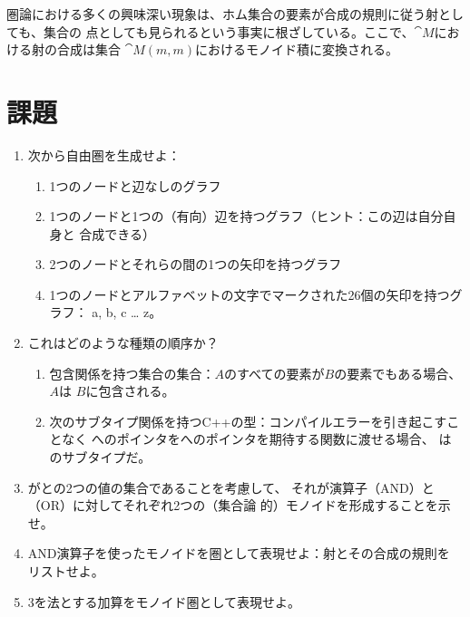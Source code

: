 圏論における多くの興味深い現象は、ホム集合の要素が合成の規則に従う射としても、集合の
点としても見られるという事実に根ざしている。ここで、$\cat{M}$における射の合成は集合
$\cat{M}(m, m)$におけるモノイド積に変換される。

\section{課題}

\begin{enumerate}
  \tightlist
  \item
        次から自由圏を生成せよ：

        \begin{enumerate}
          \tightlist
          \item
                1つのノードと辺なしのグラフ
          \item
                1つのノードと1つの（有向）辺を持つグラフ（ヒント：この辺は自分自身と
                合成できる）
          \item
                2つのノードとそれらの間の1つの矢印を持つグラフ
          \item
                1つのノードとアルファベットの文字でマークされた26個の矢印を持つグラフ：
                a, b, c \ldots{} z。
        \end{enumerate}
  \item
        これはどのような種類の順序か？

        \begin{enumerate}
          \tightlist
          \item
                包含関係を持つ集合の集合：$A$のすべての要素が$B$の要素でもある場合、$A$は
                $B$に包含される。
          \item
                次のサブタイプ関係を持つC++の型：コンパイルエラーを引き起こすことなく
                へのポインタをへのポインタを期待する関数に渡せる場合、
                はのサブタイプだ。
        \end{enumerate}
  \item
        がとの2つの値の集合であることを考慮して、
        それが演算子\code{\&\&}（AND）と\code{||}（OR）に対してそれぞれ2つの（集合論
        的）モノイドを形成することを示せ。
  \item
        AND演算子を使ったモノイドを圏として表現せよ：射とその合成の規則を
        リストせよ。
  \item
        3を法とする加算をモノイド圏として表現せよ。
\end{enumerate}
